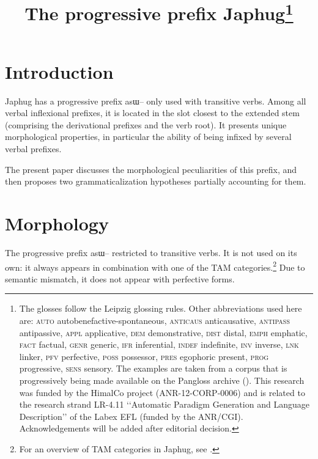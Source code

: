 \documentclass[oldfontcommands,oneside,a4paper,11pt]{article}
\newcommand{\ipa}[1]{{\phon \mbox{#1}}} %
\begin{document}
 
\title{The progressive prefix Japhug\footnote{The glosses follow the Leipzig glossing rules. Other abbreviations used here are: \textsc{auto}  autobenefactive-spontaneous, \textsc{anticaus} anticausative, \textsc{antipass} antipassive, \textsc{appl} applicative, \textsc{dem} demonstrative,  \textsc{dist} distal, \textsc{emph} emphatic, \textsc{fact} factual, \textsc{genr} generic, \textsc{ifr} inferential, \textsc{indef} indefinite, \textsc{inv} inverse,  \textsc{lnk} linker, \textsc{pfv} perfective, \textsc{poss} possessor, \textsc{pres} egophoric present, \textsc{prog} progressive, \textsc{sens} sensory. The examples are taken from a corpus that is progressively being made available on the Pangloss archive (\citealt{michailovsky14pangloss}). This research was funded by the HimalCo project (ANR-12-CORP-0006) and is related to the research strand LR-4.11 ‘‘Automatic Paradigm Generation and Language Description’’ of the Labex EFL (funded by the ANR/CGI). Acknowledgements   will be added after editorial decision.
} }
\maketitle
\linenumbers

\section{Introduction}
Japhug has a progressive prefix \ipa{asɯ--} only used with transitive verbs. Among all verbal inflexional prefixes, it is located in the slot closest to the extended stem (comprising the derivational prefixes and the verb root). It presents unique morphological properties, in particular the ability of being infixed by several verbal prefixes.

The present paper discusses the morphological peculiarities of this prefix, and then proposes two grammaticalization hypotheses partially accounting for them.

\section{Morphology}

The progressive prefix \ipa{asɯ--} restricted to transitive verbs. It is not used on its own: it always appears in combination with one of the TAM categories.\footnote{For an overview of TAM categories in Japhug, see \citealt{jacques14linking}.} Due to semantic mismatch, it does not appear with perfective forms.
\end{document}
